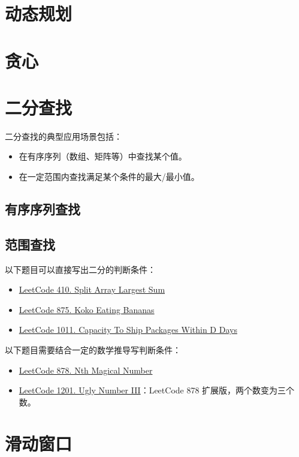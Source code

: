 \section{动态规划}

\section{贪心}

\section{二分查找}
二分查找的典型应用场景包括：

\begin{itemize}
  \item 在有序序列（数组、矩阵等）中查找某个值。
  \item 在一定范围内查找满足某个条件的最大/最小值。
\end{itemize}

\subsection{有序序列查找}

\subsection{范围查找}
以下题目可以直接写出二分的判断条件：

\begin{itemize}
  \label{lc:bs-range-general}
  \item
    \href{https://leetcode.com/problems/split-array-largest-sum/}{LeetCode 410. Split Array Largest Sum}
  \item
    \href{https://leetcode.com/problems/koko-eating-bananas/}{LeetCode 875. Koko Eating Bananas}
  \item
    \href{https://leetcode.com/problems/capacity-to-ship-packages-within-d-days/}{LeetCode
      1011. Capacity To Ship Packages Within D Days}
\end{itemize}

以下题目需要结合一定的数学推导写判断条件：

\begin{itemize}
  \label{lc:bs-range-math}
  \item
    \href{https://leetcode.com/problems/nth-magical-number/}{LeetCode 878. Nth
      Magical Number}
  \item
    \href{https://leetcode.com/problems/ugly-number-iii/}{LeetCode 1201. Ugly
      Number III}：LeetCode 878 扩展版，两个数变为三个数。

\end{itemize}

\section{滑动窗口}


